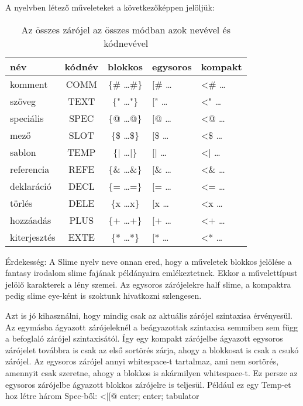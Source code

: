 {A nyelvben létező műveleteket a következőképpen jelöljük:
\begin{table}
\begin{center}
  \begin{tabular}{ | l | c | c | l | l | }
    \hline
    név		& kódnév 	& blokkos 		& egysoros 	& kompakt	\\ \hline
    komment		& COMM 		& \{\# …\#\} 	& [\# … 	& <\# … 	\\ \hline
    szöveg 		& TEXT 		& \{" …"\} 		& [" … 		& <" … 		\\ \hline
    speciális	& SPEC 		& \{@ …@\} 		& [@ … 		& <@ … 		\\ \hline
    mező 		& SLOT 		& \{\$ …\$\} 	& [\$ … 	& <\$ … 	\\ \hline
    sablon 		& TEMP 		& \{| …|\} 		& [| … 		& <| … 		\\ \hline
    referencia	& REFE 		& \{\& …\&\} 	& [\& … 	& <\& … 	\\ \hline 
    deklaráció 	& DECL 		& \{= …=\} 		& [= … 		& <= … 		\\ \hline
    törlés 		& DELE 		& \{x …x\} 		& [x … 		& <x … 		\\ \hline
    hozzáadás	& PLUS 		& \{+ …+\} 		& [+ … 		& <+ … 		\\ \hline
    kiterjesztés& EXTE 		& \{* …*\} 		& [* … 		& <* … 		\\
    \hline
  \end{tabular} 
\end{center}
\label{table:brackets}
\caption{Az összes zárójel az összes módban azok nevével és kódnevével}
\end{table}
	 	 	
Érdekesség:
A Slime nyelv neve onnan ered, hogy a műveletek blokkos jelölése a fantasy irodalom slime fajának példányaira emlékeztetnek.
Ekkor a művelettípust jelölő karakterek a lény szemei. 
Az egysoros zárójelekre half slime, a kompaktra pedig slime eye-ként is szoktunk hivatkozni szlengesen.

Azt is jó kihasználni, hogy mindig csak az aktuális zárójel szintaxisa érvényesül.
Az egymásba ágyazott zárójeleknél a beágyazottak szintaxisa semmiben sem függ a befoglaló zárójel szintaxisától. 
Így egy kompakt zárójelbe ágyazott egysoros zárójelet továbbra is csak az első sortörés zárja, ahogy a blokkosat is csak a csukó zárójel. 
Az egysoros zárójel annyi whitespace-t tartalmaz, ami nem sortörés, amennyit csak szeretne, ahogy a blokkos is akármilyen whitespace-t. 
Ez persze az egysoros zárójelbe ágyazott blokkos zárójelre is teljesül. 
Például ez egy Temp-et hoz létre három Spec-ből: <|[@ enter; enter; tabulator

}
